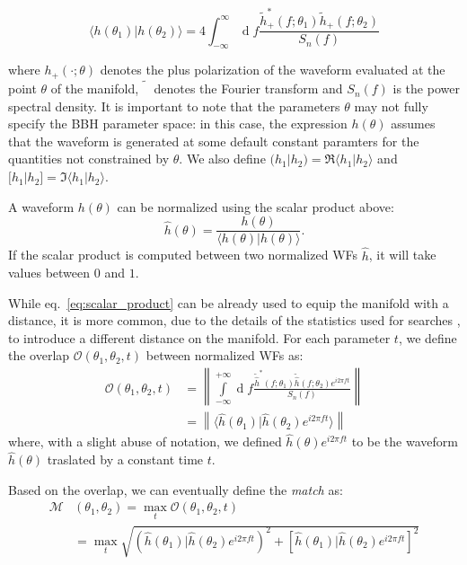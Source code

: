 \documentclass[twocolumn,showpacs,preprintnumbers,nofootinbib,prd,
superscriptaddress,10pt]{revtex4-1}
\renewcommand{\d}[1]{\ensuremath{\operatorname{d}\!{#1}}}
\newcommand{\scalar}[2]{\langle #1|#2 \rangle}
\newcommand{\rescalar}[2]{( #1|#2 )}
\newcommand{\imscalar}[2]{[ #1|#2 ]}
\begin{document}
\begin{equation} \label{eq:scalar_product}
	\scalar{h(\theta_1)}{h(\theta_2)} = 4 \int_{-\infty}^{\infty} \d{f} \frac{\tilde{h}_+^*(f;\theta_1) \tilde{h}_+(f;\theta_2)}{S_n(f)}
\end{equation}

where $h_+(\cdot; \theta)$ denotes the plus polarization of the waveform evaluated at the point $\theta$ of the manifold, $\tilde{\phantom{h}}$ denotes the Fourier transform and $S_n(f)$ is the power spectral density.
It is important to note that the parameters $\theta$ may not fully specify the BBH parameter space: in this case, the expression $h(\theta)$ assumes that the waveform is generated at some default constant paramters for the quantities not constrained by $\theta$.
We also define $\rescalar{h_1}{h_2} = \Re\scalar{h_1}{h_2}$ and $\imscalar{h_1}{h_2} = \Im\scalar{h_1}{h_2}$.

A waveform $h(\theta)$ can be normalized using the scalar product above:
\begin{equation} \label{eq:normalization}
	\hat{h}(\theta) = \frac{h(\theta)}{\scalar{h(\theta)}{h(\theta)}}.
\end{equation}
If the scalar product is computed between two normalized WFs $\hat{h}$, it will take values between $0$ and $1$.

While eq.~\eqref{eq:scalar_product} can be already used to equip the manifold with a distance, it is more common, due to the details of the statistics used for searches \cite{something}, to introduce a different distance on the manifold.
For each parameter $t$, we define the overlap $\mathcal{O}(\theta_1,\theta_2, t)$ between normalized WFs as:
\begin{align}\label{eq:overlap}
	\mathcal{O}(\theta_1,\theta_2, t) &= \left\| \int\limits_{-\infty}^{+\infty} \d{f} \frac{\tilde{\hat{h}}^*(f;\theta_1)\tilde{\hat{h}}(f;\theta_2) e^{i2\pi ft}}{S_n(f)} \right\| \nonumber\\
	&= \left\| \scalar{\hat{h}(\theta_1)}{\hat{h}(\theta_2)e^{i 2\pi ft}} \right\| 
\end{align}
where, with a slight abuse of notation, we defined $\hat{h}(\theta)e^{i 2\pi ft}$ to be the waveform $\hat{h}(\theta)$ traslated by a constant time $t$.

Based on the overlap, we can eventually define the {\it match} as:
\begin{align}\label{eq:match}
	\mathcal{M}&(\theta_1,\theta_2) = \max_t \mathcal{O}(\theta_1,\theta_2, t) \\
	&= \max_t \sqrt{ \rescalar{\hat{h}(\theta_1)}{\hat{h}(\theta_2)e^{i 2\pi ft}}^2 + \imscalar{\hat{h}(\theta_1)}{\hat{h}(\theta_2)e^{i2\pi ft}}^2 }  \nonumber 
\end{align}
\end{document}
